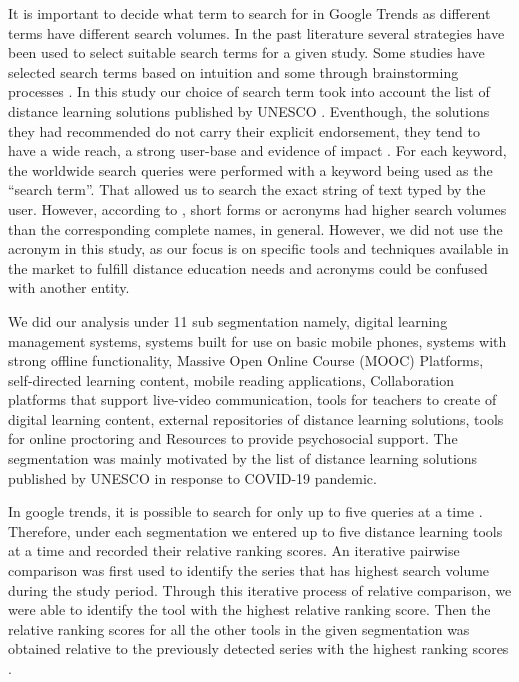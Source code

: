\documentclass[11pt,a4paper,]{article}
\begin{document}
It is important to decide what term to search for in Google Trends as different terms have different search volumes. In the past literature several strategies have been used to select suitable search terms for a given study. Some studies have selected search terms based on intuition and some through brainstorming processes \autocite{vaughan2014web}. In this study our choice of search term took into account the list of distance learning solutions published by UNESCO \autocite{unesco2020DLsolutions}. Eventhough, the solutions they had recommended do not carry their explicit endorsement, they tend to have a wide reach, a strong user-base and evidence of impact \autocite{unesco2020DLsolutions}. For each keyword, the worldwide search queries were performed with a keyword being used as the ``search term''. That allowed us to search the exact string of text typed by the user. However, according to \textcite{vaughan2014web}, short forms or acronyms had higher search volumes than the corresponding complete names, in general. However, we did not use the acronym in this study, as our focus is on specific tools and techniques available in the market to fulfill distance education needs and acronyms could be confused with another entity.

We did our analysis under 11 sub segmentation namely, digital learning management systems, systems built for use on basic mobile phones, systems with strong offline functionality, Massive Open Online Course (MOOC) Platforms, self-directed learning content, mobile reading applications, Collaboration platforms that support live-video communication, tools for teachers to create of digital learning content, external repositories of distance learning solutions, tools for online proctoring and Resources to provide psychosocial support. The segmentation was mainly motivated by the list of distance learning solutions published by UNESCO in response to COVID-19 pandemic.

In google trends, it is possible to search for only up to five queries at a time \autocite{vaughan2014web}. Therefore, under each segmentation we entered up to five distance learning tools at a time and recorded their relative ranking scores. An iterative pairwise comparison was first used to identify the series that has highest search volume during the study period. Through this iterative process of relative comparison, we were able to identify the tool with the highest relative ranking score. Then the relative ranking scores for all the other tools in the given segmentation was obtained relative to the previously detected series with the highest ranking scores \autocite{vaughan2014web}.
\end{document}
